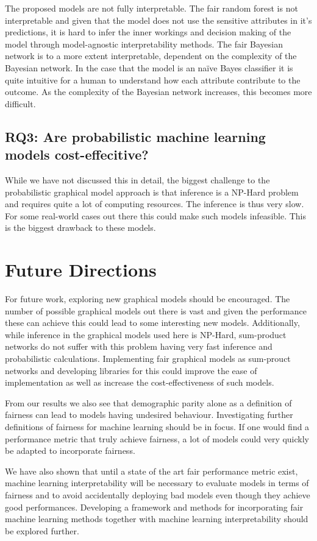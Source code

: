 The proposed models are not fully interpretable. The fair random forest is not interpretable and given that the model does not use the sensitive attributes in it's predictions, it is hard to infer the inner workings and decision making of the model through model-agnostic interpretability methods. The fair Bayesian network is to a more extent interpretable, dependent on the complexity of the Bayesian network. In the case that the model is an naïve Bayes classifier it is quite intuitive for a human to understand how each attribute contribute to the outcome. As the complexity of the Bayesian network increases, this becomes more difficult. 

\subsection{RQ3: Are probabilistic machine learning models cost-effecitive?}

While we have not discussed this in detail, the biggest challenge to the probabilistic graphical model approach is that inference is a NP-Hard problem and requires quite a lot of computing resources. The inference is thus very slow. For some real-world cases out there this could make such models infeasible. This is the biggest drawback to these models. 

\section{Future Directions}
\label{sec:conclusions:future}

For future work, exploring new graphical models should be encouraged. The number of possible graphical models out there is vast and given the performance these can achieve this could lead to some interesting new models. Additionally, while inference in the graphical models used here is NP-Hard, sum-product networks do not suffer with this problem having very fast inference and probabilistic calculations. Implementing fair graphical models as sum-prouct networks and developing libraries for this could improve the ease of implementation as well as increase the cost-effectiveness of such models.

From our results we also see that demographic parity alone as a definition of fairness can lead to models having undesired behaviour. Investigating further definitions of fairness for machine learning should be in focus. If one would find a performance metric that truly achieve fairness, a lot of models could very quickly be adapted to incorporate fairness. 

We have also shown that until a state of the art fair performance metric exist, machine learning interpretability will be necessary to evaluate models in terms of fairness and to avoid accidentally deploying bad models even though they achieve good performances. Developing a framework and methods for incorporating fair machine learning methods together with machine learning interpretability should be explored further.